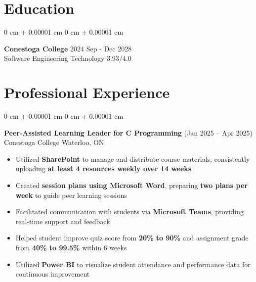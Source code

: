 \documentclass[10pt, letterpaper]{article}
\newenvironment{highlights}{
    \begin{itemize}[
        topsep=0.10 cm,
        parsep=0.10 cm,
        partopsep=0pt,
        itemsep=0pt,
        leftmargin=0 cm + 10pt
    ]
}{
    \end{itemize}
}
\newenvironment{onecolentry}{
    \begin{adjustwidth}{
        0 cm + 0.00001 cm
    }{
        0 cm + 0.00001 cm
    }
}{
    \end{adjustwidth}
}
\begin{document}
 \section{Education}
\vspace{-13pt}
\hrulefill
\vspace{+3pt}
\begin{onecolentry}
 {\normalsize \textbf{Conestoga College}} \hfill {2024 Sep - Dec 2028}\\
 \vspace{+3pt}
 {Software Engineering Technology} \hfill {3.93/4.0}\\
  \vspace{-8pt}\end{onecolentry}
 
\section{Professional Experience}
\vspace{-12pt}
\hrulefill
\begin{onecolentry}
    {\normalsize \textbf{Peer-Assisted Learning Leader for C Programming}} \hfill {(Jan 2025 – Apr 2025)}\\
    {Conestoga College} \hfill {Waterloo, ON}\\
    \begin{highlights}
        \item Utilized \textbf{SharePoint} to manage and distribute course materials, consistently uploading \textbf{at least 4 resources weekly over 14 weeks}
        \item Created \textbf{session plans using Microsoft Word}, preparing \textbf{two plans per week} to guide peer learning sessions
        \item Facilitated communication with students via \textbf{Microsoft Teams}, providing real-time support and feedback
        \item Helped student improve quiz score from \textbf{20\% to 90\%} and assignment grade from \textbf{40\% to 99.5\%} within 6 weeks
        \item Utilized \textbf{Power BI} to visualize student attendance and performance data for continuous improvement
    \end{highlights}
\end{onecolentry}
\end{document}
